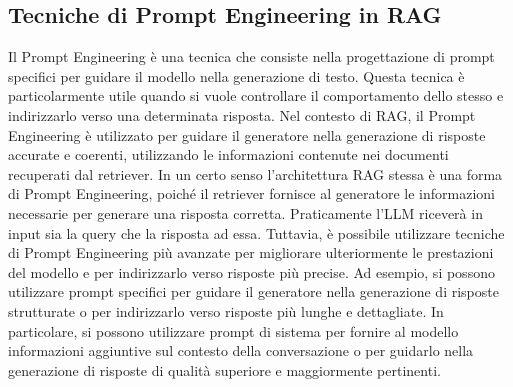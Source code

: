 \subsection{Tecniche di Prompt Engineering in RAG}
Il Prompt Engineering \cite{Beurer_Kellner_2023} è una tecnica che consiste nella progettazione di prompt specifici per guidare il modello nella generazione di testo. Questa tecnica è particolarmente utile quando si vuole controllare il comportamento dello stesso e indirizzarlo verso una determinata risposta. Nel contesto di RAG, il Prompt Engineering è utilizzato per guidare il generatore nella generazione di risposte accurate e coerenti, utilizzando le informazioni contenute nei documenti recuperati dal retriever. In un certo senso l'architettura RAG stessa è una forma di Prompt Engineering, poiché il retriever fornisce al generatore le informazioni necessarie per generare una risposta corretta. Praticamente l'LLM riceverà in input sia la query che la risposta ad essa. Tuttavia, è possibile utilizzare tecniche di Prompt Engineering più avanzate per migliorare ulteriormente le prestazioni del modello e per indirizzarlo verso risposte più precise. Ad esempio, si possono utilizzare prompt specifici per guidare il generatore nella generazione di risposte strutturate o per indirizzarlo verso risposte più lunghe e dettagliate. In particolare, si possono utilizzare prompt di sistema per fornire al modello informazioni aggiuntive sul contesto della conversazione o per guidarlo nella generazione di risposte di qualità superiore e maggiormente pertinenti.


